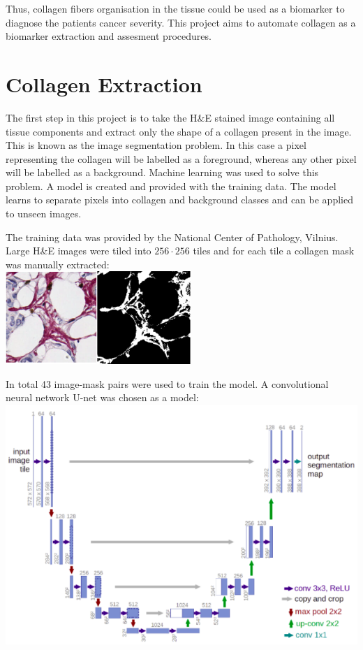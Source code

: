 \documentclass{article}
\begin{document}
Thus, collagen fibers organisation in the tissue could be used as a biomarker
to diagnose the patients cancer severity. This project aims to automate
collagen as a biomarker extraction and assesment procedures.

\section{Collagen Extraction}

The first step in this project is to take the H\&E stained image containing
all tissue components and extract only the shape of a collagen present
in the image. This is known as the image segmentation problem. In this case
a pixel representing the collagen will be labelled as a foreground, whereas any
other pixel will be labelled as a background. Machine learning was used
to solve this problem. A model is created and provided with the training data.
The model learns to separate pixels into collagen and background classes
and can be applied to unseen images.

The training data was provided by the National Center of Pathology, Vilnius.
Large H\&E images were tiled into $256 \cdot 256$ tiles and for each tile
a collagen mask was manually extracted: \\

\includegraphics[width=7cm]{images/pair.png}

In total 43 image-mask pairs were used to train the model. A convolutional neural network U-net was chosen as a model: \\

\includegraphics[width=\textwidth]{images/unet.png}
\end{document}
